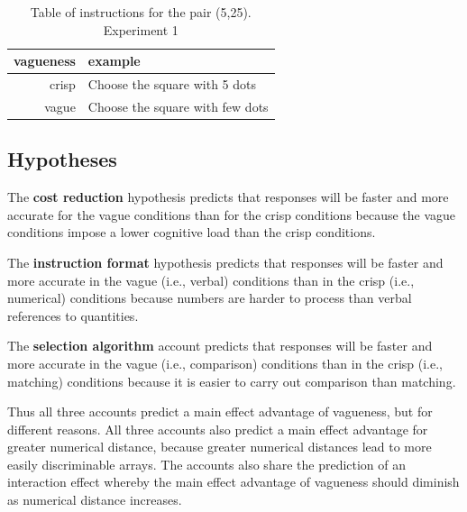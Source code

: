 \documentclass[
a4paper 
, doc
, longtable
]{apa6}
\begin{document}
\begin{table}[htbp]
\caption{Table of instructions for the pair (5,25). Experiment 1}
\label{instructionse1}
\begin{tabular}{rl}
\toprule
vagueness&example\\
\midrule
crisp 	& 	Choose the square with 5 dots \\
vague	&	Choose the square with few dots\\
\bottomrule
\end{tabular}
\end{table}

\subsection{Hypotheses}
The {\bf cost reduction} hypothesis predicts that responses will be faster and more accurate for the vague conditions than for the crisp conditions because the vague conditions impose a lower cognitive load than the crisp conditions. 

The {\bf instruction format} hypothesis predicts that responses will be faster and more accurate in the vague (i.e., verbal) conditions than in the crisp (i.e., numerical) conditions because numbers are harder to process than verbal references to quantities.

The {\bf selection algorithm} account predicts that responses will be faster and more accurate in the vague (i.e., comparison) conditions than in the crisp (i.e., matching) conditions because it is easier to carry out comparison than matching. 

Thus all three accounts predict a main effect advantage of vagueness, but for different reasons. All three accounts also predict a main effect advantage for greater numerical distance, because greater numerical distances lead to more easily discriminable arrays. The accounts also share the prediction of an interaction effect whereby the main effect advantage of vagueness should diminish as numerical distance increases.


\end{document}
